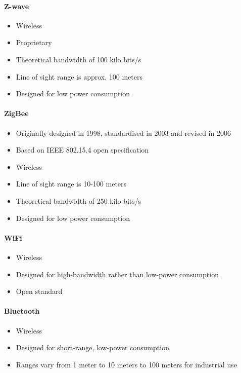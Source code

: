 \paragraph{Z-wave} \cite{wiki_zwave}

\begin{itemize}
\item Wireless
\item Proprietary
\item Theoretical bandwidth of 100 kilo bits/s
\item Line of sight range is approx. 100 meters
\item Designed for low power consumption
\end{itemize}


\paragraph{ZigBee} \cite{wiki_zigbee}

\begin{itemize}
\item Originally designed in 1998, standardised in 2003 and revised in 2006
\item Based on IEEE 802.15.4 open specification
\item Wireless
\item Line of sight range is 10-100 meters
\item Theoretical bandwidth of 250 kilo bits/s
\item Designed for low power consumption
\end{itemize}

\paragraph{WiFi} \cite{wiki_wifi}

\begin{itemize}
\item Wireless
\item Designed for high-bandwidth rather than low-power consumption
\item Open standard
\end{itemize}


\paragraph{Bluetooth} \cite{wiki_bluetooth}

\begin{itemize}
\item Wireless
\item Designed for short-range, low-power consumption
\item Ranges vary from 1 meter to 10 meters to 100 meters for industrial use
\end{itemize}




